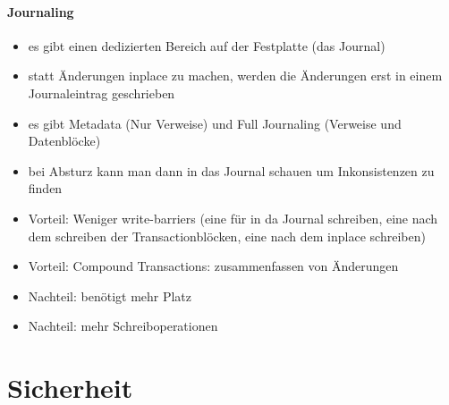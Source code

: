 \documentclass[12pt,a4paper]{article}
\begin{document}
\paragraph{Journaling}
\flushleft
\begin{itemize}
\item es gibt einen dedizierten Bereich auf der Festplatte (das Journal)
\item statt Änderungen inplace zu machen, werden die Änderungen erst in einem Journaleintrag geschrieben
\item es gibt Metadata (Nur Verweise) und Full Journaling (Verweise und Datenblöcke)
\item bei Absturz kann man dann in das Journal schauen um Inkonsistenzen zu finden
\item Vorteil: Weniger write-barriers (eine für in da Journal schreiben, eine nach dem schreiben der Transactionblöcken, eine nach dem inplace schreiben)
\item Vorteil: Compound Transactions: zusammenfassen von Änderungen
\item Nachteil: benötigt mehr Platz
\item Nachteil: mehr Schreiboperationen
\end{itemize}

\section{Sicherheit}
\end{document}
